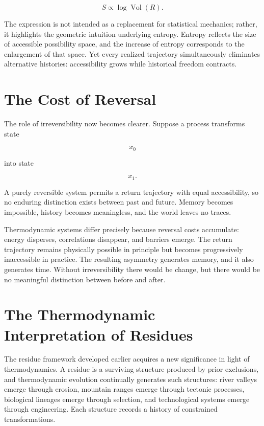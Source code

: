 \documentclass[11pt,oneside]{book}
\theoremstyle{plain}
\theoremstyle{definition}
\theoremstyle{remark}
\DeclareMathOperator{\Vol}{Vol}
\begin{document}
\begin{equation}
S
\propto
\log
\Vol(R).
\end{equation}

The expression is not intended as a replacement for statistical mechanics; rather, it highlights the geometric intuition underlying entropy. Entropy reflects the size of accessible possibility space, and the increase of entropy corresponds to the enlargement of that space. Yet every realized trajectory simultaneously eliminates alternative histories: accessibility grows while historical freedom contracts.

\section{The Cost of Reversal}

The role of irreversibility now becomes clearer. Suppose a process transforms state

\begin{equation}
x_0
\end{equation}

into state

\begin{equation}
x_1.
\end{equation}

A purely reversible system permits a return trajectory with equal accessibility, so no enduring distinction exists between past and future. Memory becomes impossible, history becomes meaningless, and the world leaves no traces.

Thermodynamic systems differ precisely because reversal costs accumulate: energy disperses, correlations disappear, and barriers emerge. The return trajectory remains physically possible in principle but becomes progressively inaccessible in practice. The resulting asymmetry generates memory, and it also generates time. Without irreversibility there would be change, but there would be no meaningful distinction between before and after.

\section{The Thermodynamic Interpretation of Residues}

The residue framework developed earlier acquires a new significance in light of thermodynamics. A residue is a surviving structure produced by prior exclusions, and thermodynamic evolution continually generates such structures: river valleys emerge through erosion, mountain ranges emerge through tectonic processes, biological lineages emerge through selection, and technological systems emerge through engineering. Each structure records a history of constrained transformations.
\end{document}
